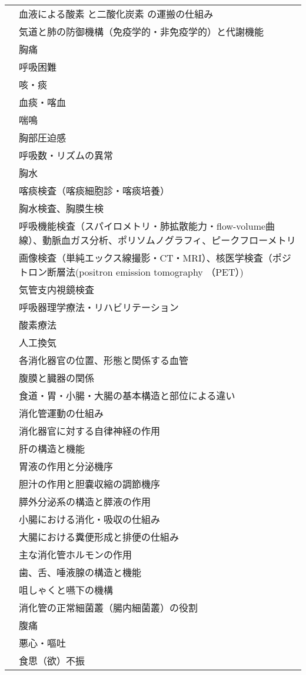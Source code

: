 \begin{xltabular}{\linewidth}{XX}
 & 血液による酸素 と二酸化炭素 の運搬の仕組み \\
 & 気道と肺の防御機構（免疫学的・非免疫学的）と代謝機能 \\
 & 胸痛 \\
 & 呼吸困難 \\
 & 咳・痰 \\
 & 血痰・喀血 \\
 & 喘鳴 \\
 & 胸部圧迫感 \\
 & 呼吸数・リズムの異常 \\
 & 胸水 \\
 & 喀痰検査（喀痰細胞診・喀痰培養） \\
 & 胸水検査、胸膜生検 \\
 & 呼吸機能検査（スパイロメトリ・肺拡散能力・flow-volume曲線）、動脈血ガス分析、ポリソムノグラフィ、ピークフローメトリ \\
 & 画像検査（単純エックス線撮影・CT・MRI）、核医学検査（ポジトロン断層法(positron emission tomography （PET）) \\
 & 気管支内視鏡検査 \\
 & 呼吸器理学療法・リハビリテーション \\
 & 酸素療法 \\
 & 人工換気 \\
 & 各消化器官の位置、形態と関係する血管 \\
 & 腹膜と臓器の関係 \\
 & 食道・胃・小腸・大腸の基本構造と部位による違い \\
 & 消化管運動の仕組み \\
 & 消化器官に対する自律神経の作用 \\
 & 肝の構造と機能 \\
 & 胃液の作用と分泌機序 \\
 & 胆汁の作用と胆嚢収縮の調節機序 \\
 & 膵外分泌系の構造と膵液の作用 \\
 & 小腸における消化・吸収の仕組み \\
 & 大腸における糞便形成と排便の仕組み \\
 & 主な消化管ホルモンの作用 \\
 & 歯、舌、唾液腺の構造と機能 \\
 & 咀しゃくと嚥下の機構 \\
 & 消化管の正常細菌叢（腸内細菌叢）の役割 \\
 & 腹痛 \\
 & 悪心・嘔吐 \\
 & 食思（欲）不振 \\

\end{xltabular}
